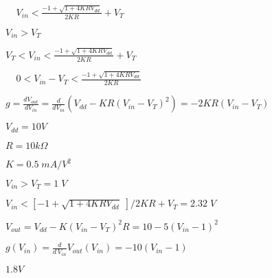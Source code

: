 \documentclass{article}
\def\lthtmlcheckvsize{\ifdim\ht\sizebox<\vsize 
  \ifdim\wd\sizebox<\hsize\expandafter\hfill\fi \expandafter\vfill
  \else\expandafter\vss\fi}%
\begin{document}
{\newpage\clearpage
{}%
$\displaystyle \;\;\;\;
V_{in}<\frac{-1+\sqrt{1+4KRV_{dd}}}{2KR}+V_T$%
\lthtmlindisplaymathZ
\lthtmlcheckvsize\clearpage}

{\newpage\clearpage
{}%
$ V_{in}>V_T$%
\lthtmlindisplaymathZ
\lthtmlcheckvsize\clearpage}

{\newpage\clearpage
{}%
$\displaystyle V_T<V_{in}<\frac{-1+\sqrt{1+4KRV_{dd}}}{2KR}+V_T
\;\;\;\;$%
\lthtmlindisplaymathZ
\lthtmlcheckvsize\clearpage}

{\newpage\clearpage
{}%
$\displaystyle \;\;\;\;
0<V_{in}-V_T <\frac{-1+\sqrt{1+4KRV_{dd}}}{2KR}$%
\lthtmlindisplaymathZ
\lthtmlcheckvsize\clearpage}

{\newpage\clearpage
{}%
$\displaystyle g=\frac{d V_{out}}{d V_{in}}=\frac{d}{d V_{in}}(V_{dd}-KR(V_{in}-V_T)^2 )
=-2KR(V_{in}-V_T)$%
\lthtmlindisplaymathZ
\lthtmlcheckvsize\clearpage}

{\newpage\clearpage
{}%
$ V_{dd}=10V$%
\lthtmlindisplaymathZ
\lthtmlcheckvsize\clearpage}

{\newpage\clearpage
{}%
$ R=10 k\Omega$%
\lthtmlindisplaymathZ
\lthtmlcheckvsize\clearpage}

{\newpage\clearpage
{}%
$ K=0.5\;mA/V^2$%
\lthtmlindisplaymathZ
\lthtmlcheckvsize\clearpage}

{\newpage\clearpage
{}%
$ V_{in}>V_T=1\;V$%
\lthtmlindisplaymathZ
\lthtmlcheckvsize\clearpage}

{\newpage\clearpage
{}%
$ V_{in}<[-1+\sqrt{1+4KRV_{dd}}\;]/2KR+V_T=2.32\;V $%
\lthtmlindisplaymathZ
\lthtmlcheckvsize\clearpage}

{\newpage\clearpage
{}%
$\displaystyle V_{out}=V_{dd}-K(V_{in}-V_T)^2 R=10-5(V_{in}-1)^2$%
\lthtmlindisplaymathZ
\lthtmlcheckvsize\clearpage}

{\newpage\clearpage
{}%
$\displaystyle g(V_{in})=\frac{d}{d\,V_{in}} V_{out}(V_{in})=-10(V_{in}-1)$%
\lthtmlindisplaymathZ
\lthtmlcheckvsize\clearpage}

{\newpage\clearpage
{}%
$ 1.8V$%
\lthtmlindisplaymathZ
\lthtmlcheckvsize\clearpage}
\end{document}

